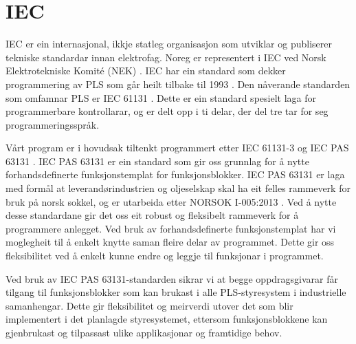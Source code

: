 \section{IEC}
\thispagestyle{fancy}
\label{sec:5.2}


\gls{IEC} \citep{IEC} er ein internasjonal, ikkje statleg organisasjon som utviklar og publiserer tekniske standardar innan elektrofag. 
Noreg er representert i \gls{IEC} ved Norsk Elektrotekniske Komité (\gls{NEK}) \citep{IEC-SNL}. 
\gls{IEC} har ein standard som dekker programmering av \gls{PLS} som går heilt tilbake til 1993 \citep{Wiki-93}. 
Den nåverande standarden som omfamnar PLS er IEC 61131 \citep{IEC-61131}. Dette er ein standard spesielt laga for programmerbare kontrollarar, og er delt opp i ti delar, der del tre tar for seg programmeringsspråk. 

Vårt program er i hovudsak tiltenkt programmert etter \gls{IEC} 61131-3 og \gls{IEC} \gls{PAS} 63131 \citep{IEC-63131}. 
\Gls{IEC} \gls{PAS} 63131 er ein standard som gir oss grunnlag for å nytte forhandsdefinerte funksjonstemplat for funksjonsblokker. 
\gls{IEC} \gls{PAS} 63131 er laga med formål at leverandørindustrien og oljeselskap skal ha eit felles rammeverk for bruk på norsk sokkel, og er utarbeida etter NORSOK I-005:2013 \citep{NORSOK}.
Ved å nytte desse standardane gir det oss eit robust og fleksibelt rammeverk for å programmere anlegget. 
Ved bruk av forhandsdefinerte funksjonstemplat har vi moglegheit til å enkelt knytte saman fleire delar av programmet. 
Dette gir oss fleksibilitet ved å enkelt kunne endre og leggje til funksjonar i programmet.

Ved bruk av \gls{IEC} \gls{PAS} 63131-standarden sikrar vi at begge oppdragsgivarar får tilgang til funksjonsblokker 
som kan brukast i alle \gls{PLS}-styresystem i industrielle samanhengar. Dette gir fleksibilitet 
og meirverdi utover det som blir implementert i det planlagde styresystemet, 
ettersom funksjonsblokkene kan gjenbrukast og tilpassast ulike applikasjonar og framtidige behov.
\newpage

